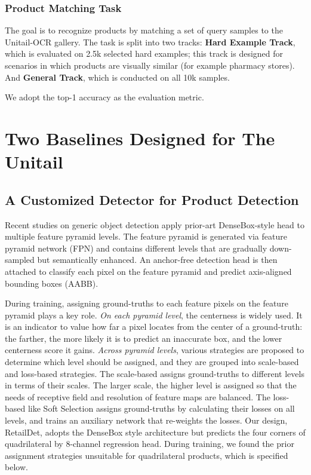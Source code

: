 \documentclass[runningheads]{llncs}
\begin{document}
\subsubsection{Product Matching Task} 
The goal is to recognize products by matching a set of query samples to the Unitail-OCR gallery. The task is split into two tracks: \textbf{Hard Example Track}, which is evaluated on 2.5k selected hard examples; this track is designed for scenarios in which products are visually similar (for example pharmacy stores). And \textbf{General Track}, which is conducted on all 10k samples. 

We adopt the top-1 accuracy as the evaluation metric.

\section{Two Baselines Designed for The Unitail}

\subsection{A Customized Detector for Product Detection}
Recent studies \cite{zhang2020bridging,tian2019fcos,zhu2020soft,foveabox,Chen2020NCMS} on generic object detection apply prior-art DenseBox-style head \cite{densebox} to multiple feature pyramid levels. The feature pyramid is generated via feature pyramid network (FPN) \cite{lin2016feature} and contains different levels that are gradually down-sampled but semantically enhanced. An anchor-free detection head is then attached to classify each pixel on the feature pyramid and predict axis-aligned bounding boxes (AABB). 

During training, assigning ground-truths to each feature pixels on the feature pyramid plays a key role. \textit{On each pyramid level}, the centerness \cite{tian2019fcos} is widely used. It is an indicator to value how far a pixel locates from the center of a ground-truth: the farther, the more likely it is to predict an inaccurate box, and the lower centerness score it gains. \textit{Across pyramid levels}, various strategies are proposed to determine which level should be assigned, and they are grouped into scale-based and loss-based strategies. The scale-based \cite{lin2016feature,foveabox,ren2015faster,tian2019fcos} assigns ground-truths to different levels in terms of their scales. The larger scale, the higher level is assigned so that the needs of receptive field and resolution of feature maps are balanced. The loss-based like Soft Selection \cite{zhu2020soft} assigns ground-truths by calculating their losses on all levels, and trains an auxiliary network that re-weights the losses. Our design, RetailDet, adopts the DenseBox style architecture but predicts the four corners of quadrilateral by 8-channel regression head. During training, we found the prior assignment strategies unsuitable for quadrilateral products, which is specified below.    
\end{document}

